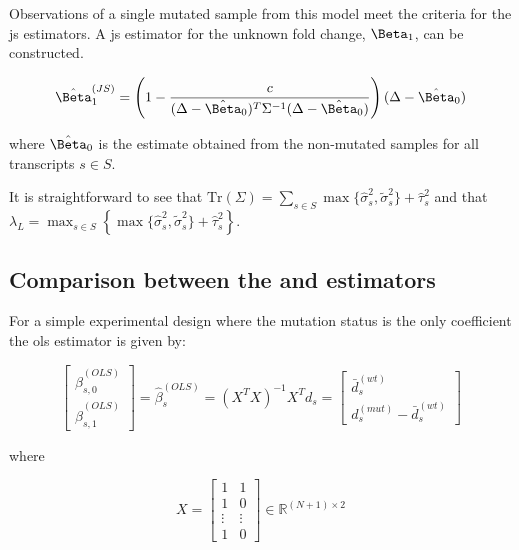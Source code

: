 Observations of a single mutated sample from this model meet the criteria for the \gls{js} estimators.
A \gls{js} estimator for the unknown fold change, $\Beta_1$, can be constructed.

\begin{equation}
  \hat{\Beta}_1^{(JS)} = \left( 1 - \frac{c}{(\Delta - \hat{\Beta}_0)^T \Sigma^{-1} (\Delta - \hat{\Beta}_0)} \right)(\Delta - \hat{\Beta}_0)
  \label{eqn:js_defn}
\end{equation}

where $\hat{\Beta}_0$ is the estimate obtained from the non-mutated samples for all transcripts $s \in S$.

It is straightforward to see that $\text{Tr}(\Sigma) = \sum_{s \in S} \max\{ \hat{\sigma}_s^2, \tilde{\sigma}_s^2 \} + \hat{\tau}_s^2$ and that $\lambda_L = \max_{s \in S} \left\{ \max\{ \hat{\sigma}_s^2, \tilde{\sigma}_s^2 \} + \hat{\tau}_s^2 \right\}$.

\subsection{Comparison between the  and  estimators}

For a simple experimental design where the mutation status is the only coefficient the \gls{ols} estimator is given by:

\begin{equation*}
  \begin{bmatrix}
    \hat{\beta}_{s,0}^{(OLS)} \\
    \hat{\beta}_{s,1}^{(OLS)}
  \end{bmatrix}
  = \hat{\beta}_s^{(OLS)}
  = (X^TX)^{-1}X^T d_s
  = \begin{bmatrix}
    \bar{d}_s^{(wt)} \\
    d_s^{(mut)} - \bar{d}_s^{(wt)}
  \end{bmatrix}
\end{equation*}

where

\begin{equation*}
  X = \begin{bmatrix}
    1      & 1      \\
    1      & 0      \\
    \vdots & \vdots \\
    1      & 0
  \end{bmatrix}
  \in \mathbb{R}^{(N + 1) \times 2}
\end{equation*}


